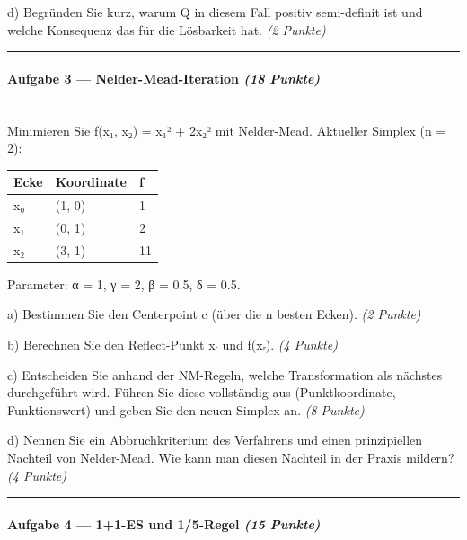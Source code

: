 \documentclass[11pt, a4paper]{article}
\begin{document}
d) Begründen Sie kurz, warum Q in diesem Fall positiv semi-definit ist und welche Konsequenz das für die Lösbarkeit hat. \textit{(2 Punkte)}



\noindent\textcolor{rulegray}{\rule{\linewidth}{0.4pt}}


\paragraph{Aufgabe 3 — Nelder-Mead-Iteration \textit{(18 Punkte)}}\mbox{}\\[2pt]

Minimieren Sie f(x₁, x₂) = x₁² + 2x₂² mit Nelder-Mead. Aktueller Simplex (n = 2):



{\small
\begin{tabularx}{\linewidth}{XXX}
\hline
\rowcolor{tableheadbg}
{\color{white}\textbf{Ecke}} & {\color{white}\textbf{Koordinate}} & {\color{white}\textbf{f}} \\[2pt]
\hline
\endhead
\hline
\endfoot
x⃗₀ & (1, 0) & 1 \\
x⃗₁ & (0, 1) & 2 \\
x⃗₂ & (3, 1) & 11 \\
\end{tabularx}
}


Parameter: α = 1, γ = 2, β = 0.5, δ = 0.5.


a) Bestimmen Sie den Centerpoint c⃗ (über die n besten Ecken). \textit{(2 Punkte)}


b) Berechnen Sie den Reflect-Punkt x⃗ᵣ und f(x⃗ᵣ). \textit{(4 Punkte)}


c) Entscheiden Sie anhand der NM-Regeln, welche Transformation als nächstes durchgeführt wird. Führen Sie diese vollständig aus (Punktkoordinate, Funktionswert) und geben Sie den neuen Simplex an. \textit{(8 Punkte)}


d) Nennen Sie ein Abbruchkriterium des Verfahrens und einen prinzipiellen Nachteil von Nelder-Mead. Wie kann man diesen Nachteil in der Praxis mildern? \textit{(4 Punkte)}



\noindent\textcolor{rulegray}{\rule{\linewidth}{0.4pt}}


\paragraph{Aufgabe 4 — 1+1-ES und 1/5-Regel \textit{(15 Punkte)}}\mbox{}\\[2pt]
\end{document}
